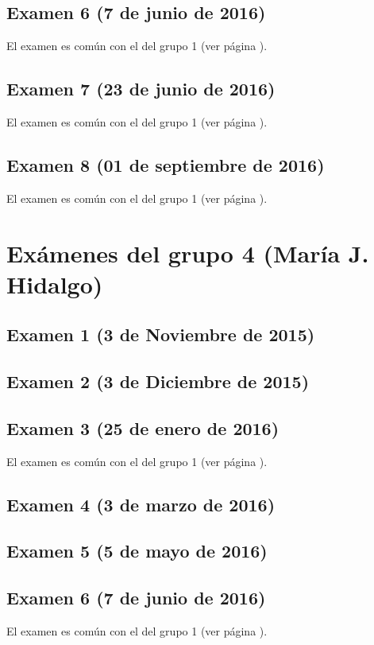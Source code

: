 \documentclass[a4paper,12pt,twoside]{book}
\begin{document}
\subsection{Examen 6 (7 de junio de 2016)}
El examen es común con el del grupo 1 (ver página \pageref{examen_15_16_4_6}).
\subsection{Examen 7 (23 de junio de 2016)}
El examen es común con el del grupo 1 (ver página \pageref{examen_15_16_4_7}).
\subsection{Examen 8 (01 de septiembre de 2016)}
El examen es común con el del grupo 1 (ver página \pageref{examen_15_16_4_8}).

\section{Exámenes del grupo 4 (María J. Hidalgo)}
\subsection{Examen 1 (3 de Noviembre de 2015)}
\subsection{Examen 2 (3 de Diciembre de 2015)}
\subsection{Examen 3 (25 de enero de 2016)}
El examen es común con el del grupo 1 (ver página \pageref{examen_15_16_4_3}).
\subsection{Examen 4 (3 de marzo de 2016)}
\subsection{Examen 5 (5 de mayo de 2016)}
\subsection{Examen 6 (7 de junio de 2016)}
El examen es común con el del grupo 1 (ver página \pageref{examen_15_16_4_6}).
\end{document}
